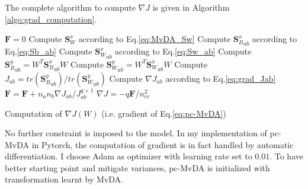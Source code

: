         The complete algorithm to compute $\nabla J$ is given in Algorithm \ref{algo:grad_computation}.

        \begin{algorithm}
            \SetEndCharOfAlgoLine{\relax}
            $\boldsymbol{F} = 0$\;
            Compute $\boldsymbol{S}_W^x$ according to Eq.\eqref{eq:MvDA_Sw}\;
             {
                 {
                    Compute ${\boldsymbol{S}_B^x}_{ab}$ according to Eq.\eqref{eq:Sb_ab}\;
                    Compute ${\boldsymbol{S}_W^x}_{ab}$ according to Eq.\eqref{eq:Sw_ab}\;
                    Compute ${\boldsymbol{S}_B^y}_{ab}=W^T{\boldsymbol{S}_B^x}_{ab}W$\;
                    Compute ${\boldsymbol{S}_W^y}_{ab}=W^T{\boldsymbol{S}_W^x}_{ab}W$\;
                    Compute $J_{ab}=tr\left({\boldsymbol{S}_B^y}_{ab}\right)/tr\left({\boldsymbol{S}_W^y}_{ab}\right)$\;
                    Compute $\nabla J_{ab}$ according to Eq.\eqref{eq:grad_Jab}\;
                    $\boldsymbol{F} = \boldsymbol{F} + n_an_b\nabla J_{ab}/J_{ab}^{q+1}$\;
                }
            }
            $\nabla J = {-q\boldsymbol{F}}/{n_{cc}^2}$\;
            \caption{Computation of $\nabla J\left(W\right)$ (i.e. gradient of Eq.\eqref{eq:pc-MvDA})}
            \label{algo:grad_computation}
        \end{algorithm}

        No further constraint is imposed to the model. In my implementation of pc-MvDA in Pytorch, the computation of gradient is in fact handled by automatic differentiation. I choose Adam as optimizer with learning rate set to $0.01$. To have better starting point and mitigate variances, pc-MvDA is initialized with transformation learnt by MvDA.
